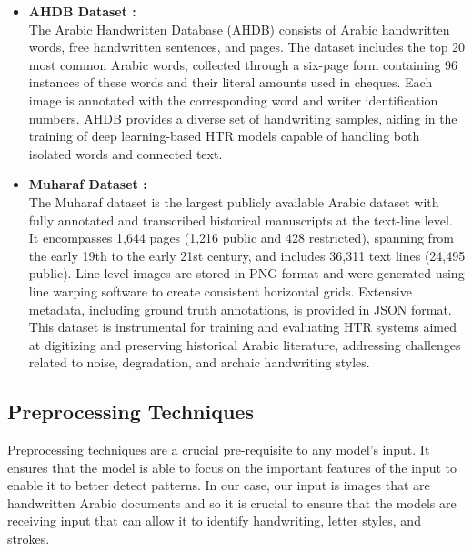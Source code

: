\documentclass[conference]{IEEEtran}
\newcounter{customsubsubsection} %
\let\oldsubsection\subsection
\renewcommand{\subsection}[1]{%
  \oldsubsection{#1}%
  \setcounter{customsubsubsection}{0}%
}
\begin{document}
\begin{itemize}
  \item \textbf{AHDB Dataset \cite{al2002data}:} \\
  The Arabic Handwritten Database (AHDB) consists of Arabic handwritten words, free handwritten sentences, and pages. The dataset includes the top 20 most common Arabic words, collected through a six-page form containing 96 instances of these words and their literal amounts used in cheques. Each image is annotated with the corresponding word and writer identification numbers. AHDB provides a diverse set of handwriting samples, aiding in the training of deep learning-based HTR models capable of handling both isolated words and connected text.

  \item \textbf{Muharaf Dataset \cite{saeed2024muharaf}:} \\
  The Muharaf dataset is the largest publicly available Arabic dataset with fully annotated and transcribed historical manuscripts at the text-line level. It encompasses 1,644 pages (1,216 public and 428 restricted), spanning from the early 19th to the early 21st century, and includes 36,311 text lines (24,495 public). Line-level images are stored in PNG format and were generated using line warping software to create consistent horizontal grids. Extensive metadata, including ground truth annotations, is provided in JSON format. This dataset is instrumental for training and evaluating HTR systems aimed at digitizing and preserving historical Arabic literature, addressing challenges related to noise, degradation, and archaic handwriting styles.
\end{itemize}





\subsection{Preprocessing Techniques}

Preprocessing techniques are a crucial pre-requisite to any model's input. It ensures that the model is able to focus on the important features of the input to enable it to better detect patterns. In our case, our input is images that are handwritten Arabic documents and so it is crucial to ensure that the models are receiving input that can allow it to identify handwriting, letter styles, and strokes. 
\end{document}
